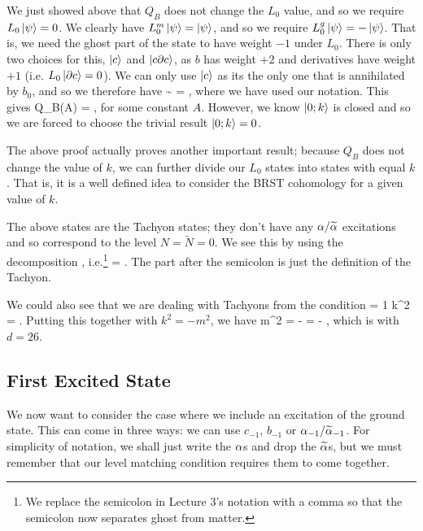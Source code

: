     We just showed above that $Q_B$ does not change the $L_0$ value, and so we require $L_0\ket{\psi} =0$. We clearly have $L_0^m\ket{\psi} = \ket{\psi}$, and so we require $L_0^g\ket{\psi}=-\ket{\psi}$. That is, we need the ghost part of the state to have weight $-1$ under $L_0$. There is only two choices for this, $\ket{c}$ and $\ket{c\partial c}$, as $b$ has weight $+2$ and derivatives have weight $+1$ (i.e. $L_0\ket{\partial c} = 0$). We can only use $\ket{c}$ as its the only one that is annihilated by $b_0$, and so we therefore have 
    \bse 
        \ket{\psi} \sim {} = ,
    \ese 
    where we have used our notation. This gives 
    \bse 
        Q_B\big(A\big) = ,
    \ese 
    for some constant $A$. However, we know $\ket{0;k}$ is closed and so we are forced to choose the trivial result $\ket{0;k}=0$. 
\eq 

\br 
\label{rem:BRSTWellDefinedk}
    The above proof actually proves another important result; because $Q_B$ does not change the value of $k$, we can further divide our $L_0$ states into states with equal $k$. That is, it is a well defined idea to consider the BRST cohomology for a given value of $k$. 
\er 

The above states are the Tachyon states; they don't have any $\alpha/\widetilde{\alpha}$ excitations and so correspond to the level $N=\widetilde{N}=0$. We see this by using the decomposition , i.e.\footnote{We replace the semicolon in Lecture 3's notation with a comma so that the semicolon now separates ghost from matter.}
\bse 
     = .
\ese 
The part after the semicolon is just the definition of the Tachyon.

\br 
    We could also see that we are dealing with Tachyons from the condition 
    \bse 
         = 1 \qquad \implies \qquad k^2 = .
    \ese 
    Putting this together with $k^2=-m^2$, we have 
    \bse 
        m^2 = -  = - ,
    \ese 
    which is  with $d=26$.
\er 

\subsection{First Excited State}

We now want to consider the case where we include an excitation of the ground state. This can come in three ways: we can use $c_{-1}$, $b_{-1}$ or $\alpha_{-1}/\widetilde{\alpha}_{-1}$. For simplicity of notation, we shall just write the $\alpha$s and drop the $\widetilde{\alpha}$s, but we must remember that our level matching condition requires them to come together. 

